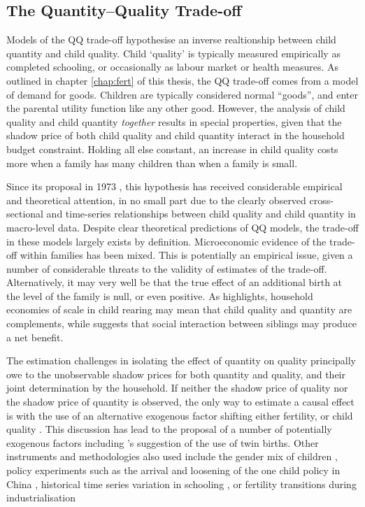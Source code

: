 \subsection{The Quantity--Quality Trade-off}
Models of the QQ trade-off hypothesise an inverse realtionship between child
quantity and child quality. Child `quality' is typically measured empirically as
completed schooling, or occasionally as labour market or health measures.  As
outlined in chapter \ref{chap:fert} of this thesis, the QQ trade-off comes
from a model of demand for goods.  Children are typically considered normal
``goods'', and enter the parental utility function like any other good. However, 
the analysis of child quality and child quantity \emph{together} results in 
special properties, given that the shadow price of both child quality and child 
quantity interact in the household budget constraint. Holding all else constant, 
an increase in child quality costs more when a family has many children than 
when a family is small.

Since its proposal in 1973 \citep{BeckerLewis1973,DeTray1973,Willis1973}, this 
hypothesis has received considerable empirical and theoretical attention, in no 
small part due to the clearly observed cross-sectional and time-series 
relationships between child quality and child quantity in macro-level data.  
Despite clear theoretical predictions of QQ models, the trade-off in these
models largely exists by definition. Microeconomic evidence of the trade-off 
within families has been mixed. This is potentially an empirical issue, given a 
number of considerable threats to the validity of estimates of the trade-off.  
Alternatively, it may very well be that the true effect of an additional birth 
at the level of the family is null, or even positive. As \cite{Qian2009} 
highlights, household economies of scale in child rearing may mean that child 
quality and quantity are complements, while \citet{Iacovou2001} suggests that 
social interaction between siblings may produce a net benefit.

The estimation challenges in isolating the effect of quantity on quality 
principally owe to the unobservable shadow prices for both quantity and
quality, and their joint determination by the household. If neither the shadow 
price of quality nor the shadow price of quantity is observed, the only way to 
estimate a causal effect is with the use of an alternative exogenous factor 
shifting either fertility, or child quality \citep{RosenzweigWolpin1980,
RosenzweigWolpin1980b}.  This discussion has lead to the proposal of a number
of potentially exogenous factors including \citeauthor{RosenzweigWolpin1980}'s
suggestion of the use of twin births.  Other instruments and methodologies also 
used include the gender mix of children \citep{ConleyGlauber2006}, policy 
experiments such as the arrival and loosening of the one child policy in China 
\citep{Qian2009,ArgysAverett2015}, historical time series variation in schooling
\citep{BleakleyLange2009}, or fertility transitions during industrialisation 
\citep{DalgaardStrulik2015}

